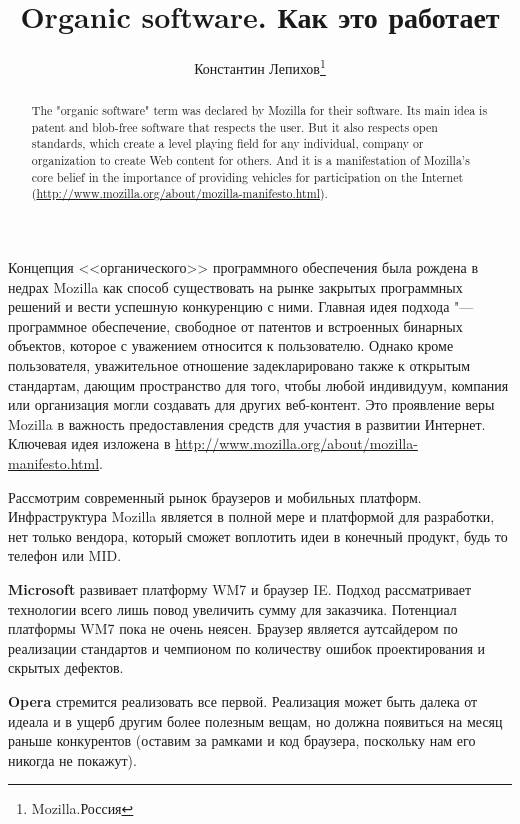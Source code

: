 \documentclass[10pt, a5paper]{article}
\begin{document}
\title{Organic software. Как это работает}
\author{Константин Лепихов\footnote{Mozilla.Россия}}
\date{}
\maketitle

\begin{abstract}
The "organic software" term was declared by Mozilla for their software.
Its main idea is patent and blob-free software that respects the user. But it also
respects open standards, which create a level playing field for any
individual, company or organization to create Web content for others. And it is a
manifestation of Mozilla's core belief in the importance of providing vehicles
for participation on the Internet (\url{http://www.mozilla.org/about/mozilla-manifesto.html}).
\end{abstract}

Концепция <<органического>> программного обеспечения была рождена в недрах Mozilla как 
способ существовать на рынке закрытых программных решений и вести успешную
конкуренцию с ними. Главная идея подхода "--- программное обеспечение, свободное от
патентов и встроенных бинарных объектов, которое с уважением относится к пользователю.
Однако кроме пользователя, уважительное отношение задекларировано также к открытым стандартам,
дающим пространство для того, чтобы любой индивидуум, компания или организация могли создавать
для других веб-контент. Это проявление веры Mozilla в важность предоставления средств для
участия в развитии Интернет.
Ключевая идея изложена в \url{http://www.mozilla.org/about/mozilla-manifesto.html}.

Рассмотрим современный рынок браузеров и мобильных платформ. Инфраструктура
Mozilla является в полной мере и платформой для разработки, нет только вендора,
который сможет воплотить идеи в конечный продукт, будь то телефон или MID.

{\bf Microsoft} развивает платформу WM7 и браузер IE. Подход рассматривает 
технологии всего лишь повод увеличить сумму для заказчика. Потенциал платформы WM7 пока 
не очень неясен. Браузер является аутсайдером по реализации стандартов и чемпионом
по количеству ошибок проектирования и скрытых дефектов. 

{\bf Opera} стремится реализовать все первой. Реализация может быть
далека от идеала и в ущерб другим более полезным вещам, но должна появиться на месяц
раньше конкурентов (оставим за рамками и код браузера, поскольку нам
его никогда не покажут).
\end{document}
